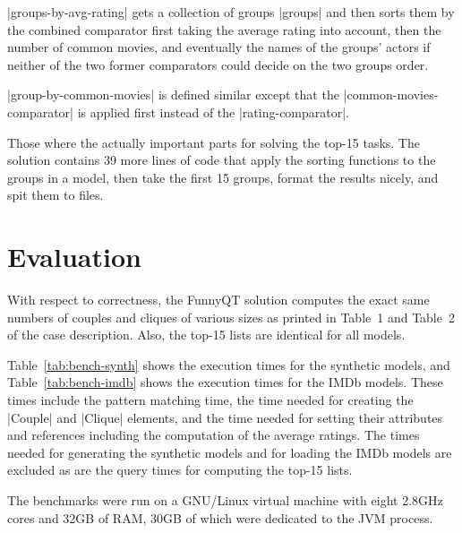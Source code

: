 \documentclass[a4paper]{article}
\newcommand{\code}{\clojureinline}
\begin{document}
\code|groups-by-avg-rating| gets a collection of groups \code|groups| and then
sorts them by the combined comparator first taking the average rating into
account, then the number of common movies, and eventually the names of the
groups' actors if neither of the two former comparators could decide on the two
groups order.

\code|group-by-common-movies| is defined similar except that the
\code|common-movies-comparator| is applied first instead of the
\code|rating-comparator|.

Those where the actually important parts for solving the top-15 tasks.  The
solution contains 39 more lines of code that apply the sorting functions to the
groups in a model, then take the first 15 groups, format the results nicely,
and spit them to files.


\section{Evaluation}
\label{sec:evaluation}

With respect to correctness, the FunnyQT solution computes the exact same
numbers of couples and cliques of various sizes as printed in Table~1 and
Table~2 of the case description.  Also, the top-15 lists are identical for all
models.

Table~\ref{tab:bench-synth} shows the execution times for the synthetic models,
and Table~\ref{tab:bench-imdb} shows the execution times for the IMDb models.
These times include the pattern matching time, the time needed for creating the
\code|Couple| and \code|Clique| elements, and the time needed for setting their
attributes and references including the computation of the average ratings.
The times needed for generating the synthetic models and for loading the IMDb
models are excluded as are the query times for computing the top-15 lists.

The benchmarks were run on a GNU/Linux virtual machine with eight 2.8GHz cores
and 32GB of RAM, 30GB of which were dedicated to the JVM process.
\end{document}
